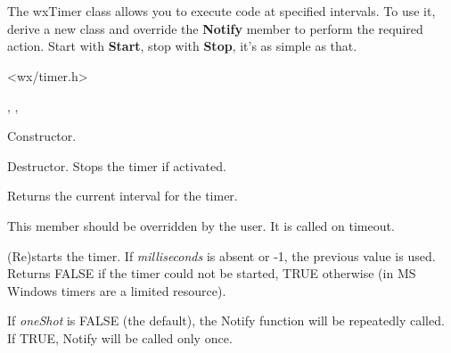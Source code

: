 \section{}\label{wxtimer}

The wxTimer class allows you to execute code at specified intervals. To
use it, derive a new class and override the {\bf Notify} member to
perform the required action. Start with {\bf Start}, stop with {\bf
Stop}, it's as simple as that.




<wx/timer.h>


, , 




Constructor.



Destructor. Stops the timer if activated.



Returns the current interval for the timer.



This member should be overridden by the user. It is called on timeout.



(Re)starts the timer. If {\it milliseconds}\/ is absent or -1, the
previous value is used. Returns FALSE if the timer could not be started,
TRUE otherwise (in MS Windows timers are a limited resource).

If {\it oneShot} is FALSE (the default), the Notify function will be repeatedly
called. If TRUE, Notify will be called only once.

